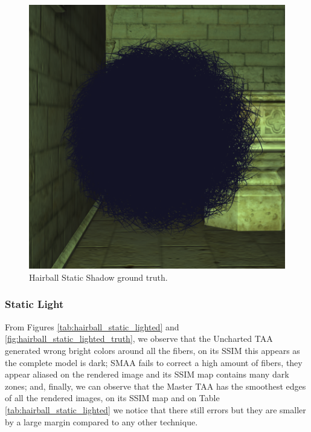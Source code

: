 \documentclass{cslthse-msc}
\begin{document}
\begin{figure}[H]
	\centering
	\includegraphics[scale=0.3]{images/results/hairball_sobel_ground_truth.png}
	\caption{Hairball Static Shadow ground truth.}\label{fig:hairball_static_shadow_truth}
\end{figure}


\subsubsection{Static Light}
From Figures \ref{tab:hairball_static_lighted} and \ref{fig:hairball_static_lighted_truth}, we observe that the Uncharted TAA generated wrong bright colors around all the fibers, on its SSIM this appears as the complete model is dark; SMAA fails to correct a high amount of fibers, they appear aliased on the rendered image and its SSIM map contains many dark zones; and, finally, we can observe that the Master TAA has the smoothest edges of all the rendered images, on its SSIM map and on Table \ref{tab:hairball_static_lighted} we notice that there still errors but they are smaller by a large margin compared to any other technique.
\end{document}
